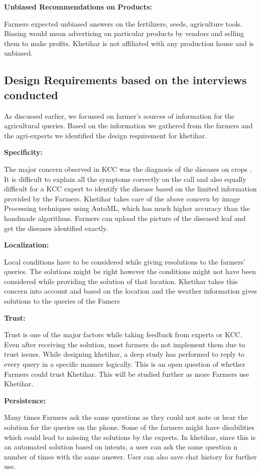 \documentclass[10pt,conference]{IEEEtran}
\begin{document}
\textbf{Unbiased Recommendations on Products: }
{\raggedright
Farmers expected unbiased answers on the fertilizers, seeds, agriculture tools. Biasing would mean advertising on particular products by vendors and selling them to make profits. Khetihar is not affiliated with any production house and is unbiased. 
}
\newline
\newline

\subsection{Design Requirements based on the interviews conducted }

{\raggedright
As discussed earlier, we focussed on farmer's sources of information for the agricultural queries. Based on the information we gathered from the farmers and the agri-experts we identified the design requirement for khetihar.
}

\textbf{Specificity:}
{\raggedright
 The major concern observed in KCC was the diagnosis of the diseases on crops \cite{albayrak2018overview}. It is difficult to explain all the symptoms correctly on the call and also equally difficult for a KCC expert to identify the disease based on the limited information provided by the Farmers. Khetihar takes care of the above concern by image Processing techniques using AutoML, which has much higher accuracy than the handmade algorithms. Farmers can upload the picture of the diseased leaf and get the diseases identified exactly. 
}

\textbf{Localization:}
{\raggedright
Local conditions have to be considered while giving resolutions to the farmers' queries. The solutions might be right however the conditions might not have been considered while providing the solution of that location. Khetihar takes this concern into account and based on the location and the weather information gives solutions to the queries of the Famers
}

\textbf{Trust:}
{\raggedright
 Trust is one of the major factors while taking feedback from experts or KCC. Even after receiving the solution, most farmers do not implement them due to trust issues. While designing khetihar, a deep study has performed to reply to every query in a specific manner logically. This is an open question of whether Farmers could trust Khetihar. This will be studied further as more Farmers use Khetihar.
 }

\textbf{Persistence:}
{\raggedright
Many times Farmers ask the same questions as they could not note or hear the solution for the queries on the phone. Some of the farmers might have disabilities which could lead to missing the solutions by the experts. In khetihar, since this is an automated solution based on intents, a user can ask the same question n number of times with the same answer. User can also save chat history for further use.
}
\end{document}
